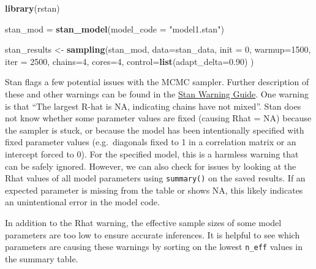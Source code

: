 \documentclass[
]{book}
\newenvironment{Shaded}{\begin{snugshade}}{\end{snugshade}}
\newcommand{\DataTypeTok}[1]{\textcolor[rgb]{0.13,0.29,0.53}{#1}}
\newcommand{\DecValTok}[1]{\textcolor[rgb]{0.00,0.00,0.81}{#1}}
\newcommand{\FloatTok}[1]{\textcolor[rgb]{0.00,0.00,0.81}{#1}}
\newcommand{\KeywordTok}[1]{\textcolor[rgb]{0.13,0.29,0.53}{\textbf{#1}}}
\newcommand{\NormalTok}[1]{#1}
\newcommand{\OperatorTok}[1]{\textcolor[rgb]{0.81,0.36,0.00}{\textbf{#1}}}
\newcommand{\StringTok}[1]{\textcolor[rgb]{0.31,0.60,0.02}{#1}}
\begin{document}
\begin{Shaded}
\begin{Highlighting}[]
\KeywordTok{library}\NormalTok{(rstan)}

\NormalTok{stan_mod =}\StringTok{ }\KeywordTok{stan_model}\NormalTok{(}\DataTypeTok{model_code =} \StringTok{"model1.stan"}\NormalTok{)}

\NormalTok{stan_results <-}\StringTok{ }\KeywordTok{sampling}\NormalTok{(stan_mod, }\DataTypeTok{data=}\NormalTok{stan_data, }\DataTypeTok{init =} \DecValTok{0}\NormalTok{, }\DataTypeTok{warmup=}\DecValTok{1500}\NormalTok{, }\DataTypeTok{iter =} \DecValTok{2500}\NormalTok{,}
                         \DataTypeTok{chains=}\DecValTok{4}\NormalTok{, }\DataTypeTok{cores=}\DecValTok{4}\NormalTok{, }\DataTypeTok{control=}\KeywordTok{list}\NormalTok{(}\DataTypeTok{adapt_delta=}\FloatTok{0.90}\NormalTok{) )}
\end{Highlighting}
\end{Shaded}

Stan flags a few potential issues with the MCMC sampler. Further description of these and other warnings can be found in the \href{https://mc-stan.org/misc/warnings.html}{Stan Warning Guide}. One warning is that ``The largest R-hat is NA, indicating chains have not mixed''. Stan does not know whether some parameter values are fixed (causing Rhat = NA) because the sampler is stuck, or because the model has been intentionally specified with fixed parameter values (e.g.~diagonals fixed to 1 in a correlation matrix or an intercept forced to 0). For the specified model, this is a harmless warning that can be safely ignored. However, we can also check for issues by looking at the Rhat values of all model parameters using \texttt{summary()} on the saved results. If an expected parameter is missing from the table or shows NA, this likely indicates an unintentional error in the model code.

\begin{Shaded}
\end{Shaded}

In addition to the Rhat warning, the effective sample sizes of some model parameters are too low to ensure accurate inferences. It is helpful to see which parameters are causing these warnings by sorting on the lowest \texttt{n\_eff} values in the summary table.
\end{document}
